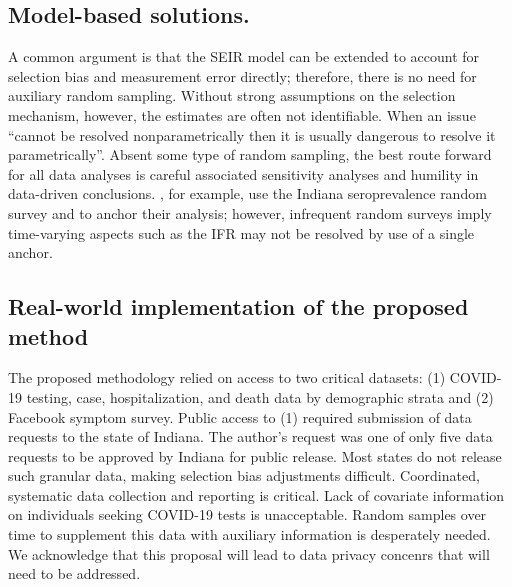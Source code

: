 \documentclass[11pt]{amsart}
\numberwithin{equation}{section}
\theoremstyle{plain}
\begin{document}
 \subsection*{Model-based solutions.}

 A common argument is that the SEIR model can be extended to account for selection bias and measurement error directly; therefore, there is no need for auxiliary random sampling.  Without strong assumptions on the selection mechanism, however, the estimates are often not identifiable.  When an issue ``cannot be resolved nonparametrically then it is usually dangerous to resolve it parametrically''\citep{CoxHink74}. Absent some type of random sampling, the best route forward for all data analyses is careful associated sensitivity analyses and humility in data-driven conclusions.  \cite{Ironse2103272118}, for example, use the Indiana seroprevalence random survey and to anchor their analysis; however, infrequent random surveys imply time-varying aspects such as the IFR may not be resolved by use of a single anchor.


 \subsection*{Real-world implementation of the proposed method}

 The proposed methodology relied on access to two critical datasets: (1) COVID-19 testing, case, hospitalization, and death data by demographic strata and (2) Facebook symptom survey.  Public access to (1) required submission of data requests to the state of Indiana.  The author's request was one of only five data requests to be approved by Indiana for public release.  Most states do not release such granular data, making selection bias adjustments difficult.  Coordinated, systematic data collection and reporting is critical.
 Lack of covariate information on individuals seeking COVID-19 tests is unacceptable.  Random samples over time to supplement this data with auxiliary information is desperately needed.  We acknowledge that this proposal will lead to data privacy concenrs that will need to be addressed.

\end{document}
